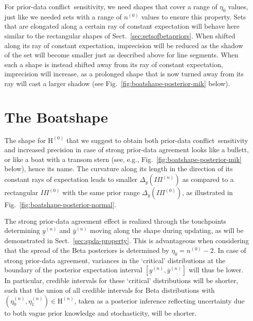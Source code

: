 \documentclass[runningheads,a4paper]{llncs}
\def\pdc{prior-data conflict}
\newcommand{\uz}{^{(0)}} %
\newcommand{\un}{^{(n)}} %
\newcommand{\ul}[1]{\underline{#1}}
\newcommand{\ol}[1]{\overline{#1}}
\def\ynl{\ul{y}\un}
\def\ynu{\ol{y}\un}
\def\nz{n\uz}
\def\PZ{I\!\!\Pi\uz}
\def\PN{I\!\!\Pi\un}
\def\EZ{\mathrm{H}\uz}
\def\EN{\mathrm{H}\un}
\def\ezn{\eta_0\un}
\def\eon{\eta_1\un}
\begin{document}
For \pdc\ sensitivity, we need shapes that cover a range of $\eta_0$ values,
just like we needed sets with a range of $\nz$ values to ensure this property.
Sets that are elongated along a certain ray of constant expectation
will behave here similar to the rectangular shapes of Sect.~\ref{sec:setsofbetapriors}.
When shifted along its ray of constant expectation,
imprecision will be reduced as the shadow of the set will become smaller just as described above for line segments.
When such a shape is instead shifted away from its ray of constant expectation,
imprecision will increase, as a prolonged shape that is now turned away from its ray 
will cast a larger shadow (see Fig.~\ref{fig:boatshape-posterior-mik} below).%


\section{The Boatshape}
\label{sec:boatshape}

The shape for $\EZ$ that we suggest to obtain both \pdc\ sensitivity and increased precision
in case of strong prior-data agreement looks like a bullett, or like a boat with a transom stern
(see, e.g., Fig.~\ref{fig:boatshape-posterior-mik} below), hence its name.
The curvature along its length in the direction of its constant rays of expectation
leads to smaller $\Delta_y(\PN)$ as compared to a rectangular $\PZ$ with the same prior range $\Delta_y(\PZ)$,
as illustrated in Fig.~\ref{fig:boatshape-posterior-normal}.

The strong prior-data agreement effect is realized
through the touchpoints determining $\ynl$ and $\ynu$
moving along the shape during updating,
as will be demonstrated in Sect.~\ref{sec:spda-property}.
This is advantageous when considering that the spread of the Beta posteriors is determined by $\eta_0 = \nz - 2$.
In case of strong prior-data agreement, variances in the `critical' distributions
at the boundary of the posterior expectation interval $[\ynl,\ynu]$ will thus be lower.
In particular, credible intervals for these `critical' distributions will be shorter, 
such that the union of all credible intervals for Beta distributions with $(\ezn, \eon) \in \EN$,
taken as a posterior inference reflecting uncertainty due to both vague prior knowledge and stochasticity, will be shorter.
%
\end{document}
